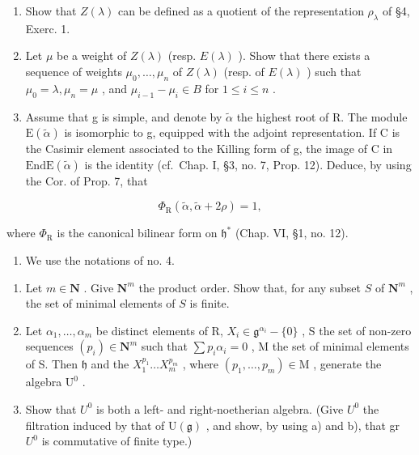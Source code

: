 
\begin{enumerate}
\def\labelenumi{\arabic{enumi})}
\item
  Show that \(Z(\lambda)\) can be defined as a quotient of the representation \(\rho_{\lambda}\) of §4, Exerc. 1.
\item
  Let \(\mu\) be a weight of \(Z(\lambda)\) (resp. \(E(\lambda)\) ). Show that there exists a sequence of weights \(\mu_0, \ldots, \mu_n\) of \(Z(\lambda)\) (resp. of \(E(\lambda)\) ) such that \(\mu_0 = \lambda, \mu_n = \mu\) , and \(\mu_{i-1} - \mu_i \in B\) for \(1 \leq i \leq n\) .
\item
  Assume that g is simple, and denote by \(\tilde{\alpha}\) the highest root of R. The module \(\mathrm{E}(\tilde{\alpha})\) is isomorphic to g, equipped with the adjoint representation. If C is the Casimir element associated to the Killing form of g, the image of C in \(\mathrm{End}\mathrm{E}(\tilde{\alpha})\) is the identity (cf.~Chap. I, §3, no. 7, Prop. 12). Deduce, by using the Cor. of Prop. 7, that
\end{enumerate}

\[
\varPhi_ {\mathrm{R}} (\tilde {\alpha}, \tilde {\alpha} + 2 \rho) = 1,
\]

where \(\Phi_{\mathrm{R}}\) is the canonical bilinear form on \(\mathfrak{h}^*\) (Chap. VI, §1, no. 12).

\begin{enumerate}
\def\labelenumi{\arabic{enumi})}
\setcounter{enumi}{3}
\tightlist
\item
  We use the notations of no. 4.
\end{enumerate}

\begin{enumerate}
\def\labelenumi{\alph{enumi})}
\item
  Let \(m \in \mathbf{N}\) . Give \(\mathbf{N}^m\) the product order. Show that, for any subset \(S\) of \(\mathbf{N}^m\) , the set of minimal elements of \(S\) is finite.
\item
  Let \(\alpha_{1},\ldots ,\alpha_{m}\) be distinct elements of R, \(X_{i}\in \mathfrak{g}^{\alpha_{i}} - \{0\}\) , S the set of non-zero sequences \((p_i)\in \mathbf{N}^m\) such that \(\sum p_i\alpha_i = 0\) , M the set of minimal elements of S. Then \(\mathfrak{h}\) and the \(X_1^{p_1}\dots X_m^{p_m}\) , where \((p_1,\dots ,p_m)\in \mathrm{M}\) , generate the algebra \(\mathrm{U}^0\) .
\item
  Show that \(U^{0}\) is both a left- and right-noetherian algebra. (Give \(U^{0}\) the filtration induced by that of \(\mathrm{U}(\mathfrak{g})\) , and show, by using a) and b), that gr \(U^{0}\) is commutative of finite type.)
\end{enumerate}

